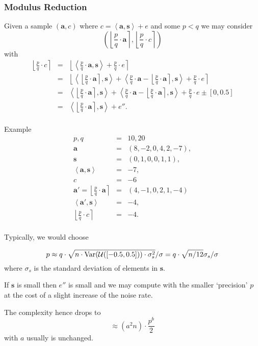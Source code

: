 \documentclass[10pt]{beamer}
\newcommand{\Var}{\ensuremath{\textnormal{Var}}}
\newcommand{\U}[1]{\ensuremath{\mathcal{U}(#1)\xspace}}
\newcommand{\dotp}[2]{\ensuremath{\left\langle {#1},{#2}\right\rangle}\xspace}
\renewcommand{\vec}[1]{\mathbf{#1}\xspace}
\newcommand{\round}[1]{\ensuremath{\left\lfloor{#1}\right\rceil}\xspace}
\begin{document}
\begin{frame}[allowframebreaks]
\frametitle{Modulus Reduction}

Given a sample $(\vec{a},c)$ where $c = \dotp{\vec{a}}{\vec{s}} + e$ and some $p < q $ we may consider $$\left(\round{\frac{p}{q} \cdot \vec{a}}, \round{\frac{p}{q} \cdot c}\right)$$ with
\begin{eqnarray*}
\round{\frac{p}{q} \cdot c} &=& \round{ \dotp{ \frac{p}{q} \cdot \vec{a} }{\vec{s} } + \frac{p}{q} \cdot e}\\
  &=& \round{ \dotp{ \round{ \frac{p}{q} \cdot \vec{a} }}{\vec{s} } + \dotp{\frac{p}{q} \cdot \vec{a} - \round{ \frac{p}{q} \cdot \vec{a} }}{\vec{s}} + \frac{p}{q} \cdot e}\\
  &=& \dotp{ \round{ \frac{p}{q} \cdot \vec{a} }}{\vec{s} } + \dotp{\frac{p}{q} \cdot \vec{a} - \round{ \frac{p}{q} \cdot \vec{a} }}{\vec{s}} + \frac{p}{q} \cdot e \pm [0,0.5]\\
  &=& \dotp{ \round{ \frac{p}{q} \cdot \vec{a} }}{\vec{s} } + e''.\\
\end{eqnarray*}

\framebreak

\begin{block}{Example}
\begin{eqnarray*}
p, q &=& 10, 20\\
\vec{a} &=& (8, -2, 0, 4, 2, -7),\\
\vec{s} &=& (0, 1, 0, 0, 1, 1),\\
 \dotp{\vec{a}}{\vec{s}} &=& -7,\\
c &=& -6\\
\vec{a'} = \round{\frac{p}{q} \cdot \vec{a}} &=& (4, -1, 0, 2, 1, -4)\\
\dotp{\vec{a'}}{\vec{s}} &=& -4,\\
\round{\frac{p}{q} \cdot c} &=& -4.\\
\end{eqnarray*}
\end{block}


\framebreak

Typically, we would choose

$$p \approx q \cdot \sqrt{n \cdot \Var(\U{[-0.5,0.5]}) \cdot \sigma^2_s}/\sigma = q \cdot \sqrt{n/12} \sigma_s/\sigma$$ where $\sigma_s$ is the standard deviation of elements in $\vec{s}$.

\vspace{1em}

If $\vec{s}$ is small then $e''$ is small and we may compute with the smaller `precision' $p$ at the cost of a slight increase of the noise rate. 

\vspace{1em}

The complexity hence drops to $$\approx (a^2n)\cdot\frac{p^b}{2}$$ with $a$ usually is unchanged.
\end{frame}
\end{document}
